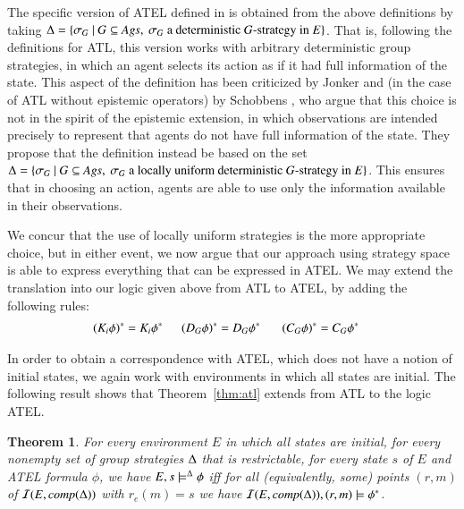 \documentclass[a4wide]{article}
\newtheorem{theorem}{Theorem}
\theoremstyle{examplesty}
\newcommand{\Ags}{\mathit{Ags}}
\newcommand{\I}{\mathcal{I}}
\newcommand{\Env}{E}
\begin{document}
The specific version of ATEL defined in \cite{ATEL} is obtained from the above definitions 
by taking 
$\GStrats = 
\{\sigma_G~|~G\subseteq \Ags, ~\sigma_G~\text{a deterministic $G$-strategy in}~ \Env\}$. 
That is, following the definitions for ATL, this version works with arbitrary deterministic group strategies, in which 
an agent selects its action 
as if it had full information of the state. 
This aspect of the definition has been 
criticized 
by Jonker \cite{Jonker2003}  and (in the case of ATL without epistemic operators) by Schobbens \cite{Schobbens2004}, 
who argue that this choice is not in the spirit of the epistemic extension, in which observations
are intended precisely to represent that 
agents do not have full information of the state. They propose that the definition instead 
be based on the set 
$
\GStrats 
= \{\sigma_G~|~G\subseteq \Ags, ~\sigma_G~\text{a locally uniform deterministic $G$-strategy in}~ \Env\}$. 
This ensures that in choosing an action, agents are able to use only the information available in their observations. 

We concur that the use of locally uniform strategies is the more appropriate choice, but in either event, 
we now argue that our approach using strategy space is able to express everything
that can be expressed in ATEL. 
We may extend the translation into our logic given above from ATL to ATEL, by adding 
the following rules:
\begin{align*} 
&  (K_i\phi)^* = K_i \phi^* ~~~~~~(D_G\phi)^* = D_G \phi^*~~~~~~~(C_G\phi)^* = C_G\phi^* 
\end{align*} 


In order to obtain a correspondence with ATEL, which does not have a notion of initial states, 
we again work with environments in which all states are initial. 
The following result shows that Theorem~\ref{thm:atl} extends from ATL to the logic ATEL. 




\begin{theorem} \label{thm:atel}
For every environment $\Env$ 
in which all states are initial,  for every 
nonempty set of group strategies 
$\Delta$ 
that is restrictable,
for every state $s$ of $\Env$ and ATEL formula $\phi$, 
we have  $\Env, s \models^\GStrats \phi$ iff for all (equivalently, some)  points $(r,m)$ of  
$\I(\Env,\compl{\GStrats}) $ with $r_e(m) = s$ we have $\I(\Env,\compl{\GStrats}), (r,m)\models \trl{\phi}$.  
\end{theorem} 
\end{document}
